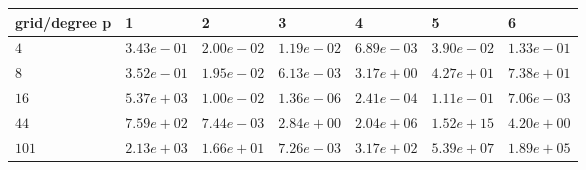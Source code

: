 \begin{tabular}{lllllll}
\hline
 grid/degree p   & 1          & 2          & 3          & 4          & 5          & 6          \\
\hline
 $4$             & $3.43e-01$ & $2.00e-02$ & $1.19e-02$ & $6.89e-03$ & $3.90e-02$ & $1.33e-01$ \\
 $8$             & $3.52e-01$ & $1.95e-02$ & $6.13e-03$ & $3.17e+00$ & $4.27e+01$ & $7.38e+01$ \\
 $16$            & $5.37e+03$ & $1.00e-02$ & $1.36e-06$ & $2.41e-04$ & $1.11e-01$ & $7.06e-03$ \\
 $44$            & $7.59e+02$ & $7.44e-03$ & $2.84e+00$ & $2.04e+06$ & $1.52e+15$ & $4.20e+00$ \\
 $101$           & $2.13e+03$ & $1.66e+01$ & $7.26e-03$ & $3.17e+02$ & $5.39e+07$ & $1.89e+05$ \\
\hline
\end{tabular}